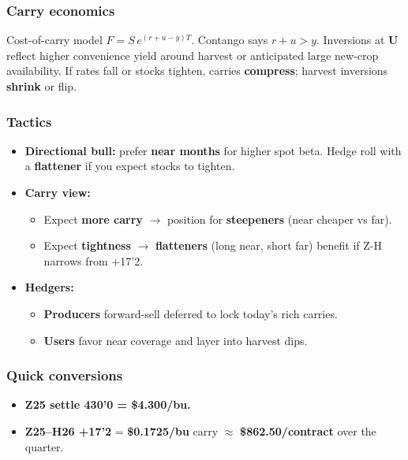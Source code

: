 \documentclass[10pt,a4paper]{article} %
\begin{document}
\subsubsection*{Carry economics}

Cost-of-carry model $F=S\,e^{(r+u-y)T}$. Contango says $r+u>y$. Inversions at \textbf{U} reflect higher convenience yield around harvest or anticipated large new-crop availability. If rates fall or stocks tighten, carries \textbf{compress}; harvest inversions \textbf{shrink} or flip.

\subsubsection*{Tactics}

\begin{itemize}
  \item \textbf{Directional bull:} prefer \textbf{near months} for higher spot beta. Hedge roll with a \textbf{flattener} if you expect stocks to tighten.
  \item \textbf{Carry view:}
    \begin{itemize}
      \item Expect \textbf{more carry} $\rightarrow$ position for \textbf{steepeners} (near cheaper vs far).
      \item Expect \textbf{tightness} $\rightarrow$ \textbf{flatteners} (long near, short far) benefit if Z-H narrows from +17'2.
    \end{itemize}
  \item \textbf{Hedgers:}
    \begin{itemize}
      \item \textbf{Producers} forward-sell deferred to lock today’s rich carries.
      \item \textbf{Users} favor near coverage and layer into harvest dips.
    \end{itemize}
\end{itemize}

\subsubsection*{Quick conversions}

\begin{itemize}
  \item \textbf{Z25 settle 430'0 = \$4.300/bu.}
  \item \textbf{Z25--H26 +17'2} = \textbf{\$0.1725/bu} carry $\approx$ \textbf{\$862.50/contract} over the quarter.
\end{itemize}
\end{document}
